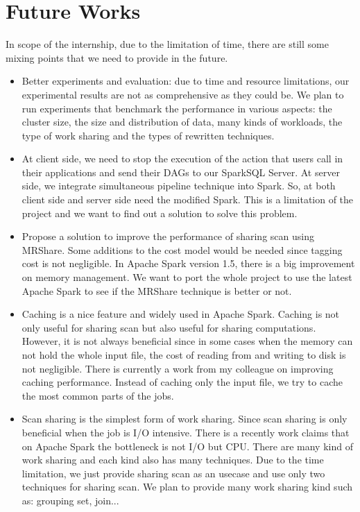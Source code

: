 \section{Future Works}
In scope of the internship, due to the limitation of time, there are still some mixing points that we need to provide in the future.
\begin{itemize}

\item Better experiments and evaluation: due to time and resource limitations, our experimental results are not as comprehensive as they could be. We plan to run experiments that benchmark the performance in various aspects: the cluster size, the size and distribution of data, many kinds of workloads, the type of work sharing and the types of rewritten techniques.

\item At client side, we need to stop the execution of the action that users call in their applications and send their DAGs to our SparkSQL Server. At server side, we integrate simultaneous pipeline technique into Spark. So, at both client side and server side need the modified Spark. This is a limitation of the project and we want to find out a solution to solve this problem.

\item Propose a solution to improve the performance of sharing scan using MRShare. Some additions to the cost model would be needed since tagging cost is not negligible. In Apache Spark version 1.5, there is a big improvement on memory management. We want to port the whole project to use the latest Apache Spark to see if the MRShare technique is better or not.

\item Caching is a nice feature and widely used in Apache Spark. Caching is not only useful for sharing scan but also useful for sharing computations. However, it is not always beneficial since in some cases when the memory can not hold the whole input file, the cost of reading from and writing to disk is not negligible. There is currently a work from my colleague \cite{khoa} on improving caching performance. Instead of caching only the input file, we try to cache the most common parts of the jobs.

\item Scan sharing is the simplest form of work sharing. Since scan sharing is only beneficial when the job is I/O intensive. There is a recently work \cite{kay2015} claims that on Apache Spark the bottleneck is not I/O but CPU.  There are many kind of work sharing and each kind also has many techniques. Due to the time limitation, we just provide sharing scan as an usecase and use only two techniques for sharing scan. We plan to provide many work sharing kind such as: grouping set, join...


\end{itemize}
